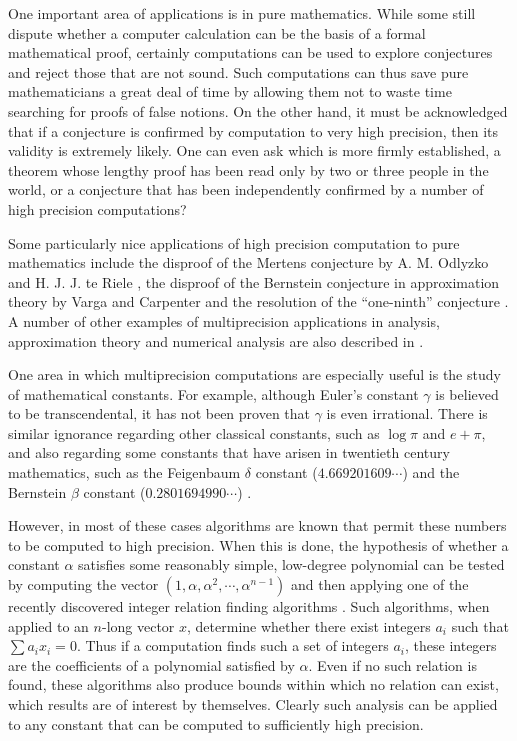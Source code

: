 One important area of applications is in pure mathematics.  While some
still dispute whether a computer calculation can be the basis of a
formal mathematical proof, certainly computations can be used to
explore conjectures and reject those that are not sound.  Such
computations can thus save pure mathematicians a great deal of time by
allowing them not to waste time searching for proofs of false notions.
On the other hand, it must be acknowledged that if a conjecture is
confirmed by computation to very high precision, then its validity is
extremely likely.  One can even ask which is more firmly established,
a theorem whose lengthy proof has been read only by two or three
people in the world, or a conjecture that has been independently
confirmed by a number of high precision computations?

Some particularly nice applications of high precision computation to
pure mathematics include the disproof of the Mertens conjecture by A.
M. Odlyzko and H. J. J. te Riele \cite{odlyzko}, the disproof of the
Bernstein conjecture in approximation theory by Varga and Carpenter
and the resolution of the ``one-ninth'' conjecture \cite{varga}.  A
number of other examples of multiprecision applications in analysis,
approximation theory and numerical analysis are also described in
\cite{varga}.

One area in which multiprecision computations are especially useful is
the study of mathematical constants.  For example, although Euler's
constant $\gamma$ is believed to be transcendental, it has not been
proven that $\gamma$ is even irrational.  There is similar ignorance
regarding other classical constants, such as $\log \pi$ and $e + \pi$,
and also regarding some constants that have arisen in twentieth
century mathematics, such as the Feigenbaum $\delta$ constant
($4.669201609 \cdots$) \cite{briggs,feig} and the Bernstein $\beta$
constant ($0.2801694990 \cdots$) \cite{varga}.

However, in most of these cases algorithms are known that permit these
numbers to be computed to high precision.  When this is done, the
hypothesis of whether a constant $\alpha$ satisfies some reasonably simple,
low-degree polynomial can be tested by computing the vector $(1,
\alpha, \alpha^2, \cdots, \alpha^{n-1})$ and then applying one of the
recently discovered integer relation finding algorithms
\cite{dhb6,ferg,hjls}.  Such algorithms, when applied to an $n$-long
vector $x$, determine whether there exist integers $a_i$ such that
$\sum a_i x_i = 0$.  Thus if a computation finds such a set of
integers $a_i$, these integers are the coefficients of a polynomial
satisfied by $\alpha$.  Even if no such relation is found, these
algorithms also produce bounds within which no relation can exist,
which results are of interest by themselves.  Clearly such analysis
can be applied to any constant that can be computed to sufficiently
high precision.

